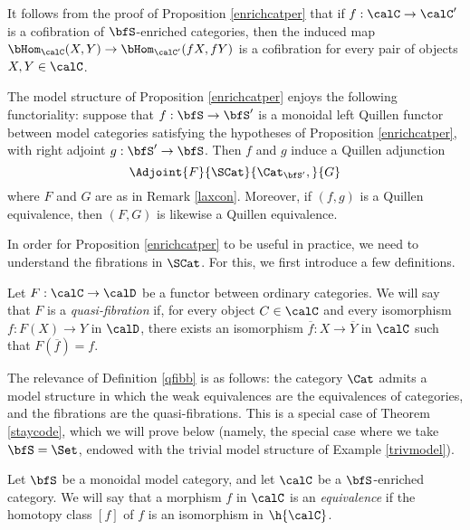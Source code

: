 \begin{Simplicial Categories}
\begin{remark}
It follows from the proof of Proposition \ref{enrichcatper} that if
$f: \calC \rightarrow \calC'$ is a cofibration of $\bfS$-enriched categories, then
the induced map $\bHom_{\calC}(X,Y) \rightarrow \bHom_{\calC'}(fX,fY)$ is a cofibration
for every pair of objects $X,Y \in \calC$.
\end{remark}

\begin{remark}\label{cuttup}
The model structure of Proposition \ref{enrichcatper} enjoys the following functoriality:
suppose that $f: \bfS \rightarrow \bfS'$ is a monoidal left Quillen functor between
model categories satisfying the hypotheses of Proposition \ref{enrichcatper}, with right adjoint $g: \bfS' \rightarrow \bfS$. Then $f$ and $g$ induce a Quillen adjunction
$$ \Adjoint{ F}{\SCat}{\Cat_{\bfS'},}{G}$$
where $F$ and $G$ are as in Remark \ref{laxcon}. Moreover, if $(f,g)$ is a Quillen equivalence,
then $(F,G)$ is likewise a Quillen equivalence.
\end{remark}

In order for Proposition \ref{enrichcatper} to be useful in practice, we need to understand the fibrations in $\SCat$. For this, we first introduce a few definitions.

\begin{definition}\label{qfibb}
Let $F: \calC \rightarrow \calD$ be a functor between ordinary categories. We will say that
$F$ is a {\it quasi-fibration} if, for every object $C \in \calC$ and every isomorphism
$f: F(X) \rightarrow Y$ in $\calD$, there exists an isomorphism $\overline{f}: X \rightarrow \overline{Y}$ in $\calC$ such that $F( \overline{f} ) = f$.
\end{definition}

\begin{remark}
The relevance of Definition \ref{qfibb} is as follows: the category $\Cat$ admits a model structure
in which the weak equivalences are the equivalences of categories, and the fibrations are the quasi-fibrations. This is a special case of Theorem \ref{staycode}, which we will prove below
(namely, the special case where we take $\bfS = \Set$, endowed with the trivial model
structure of Example \ref{trivmodel}). 
\end{remark}

\begin{definition}\label{twurp}
Let $\bfS$ be a monoidal model category, and let $\calC$ be a
$\bfS$-enriched category. We will say that a morphism $f$
in $\calC$ is an {\it equivalence} if the homotopy class $[f]$
of $f$ is an isomorphism in $\h{\calC}$.


\end{definition}
\end{Simplicial Categories}
